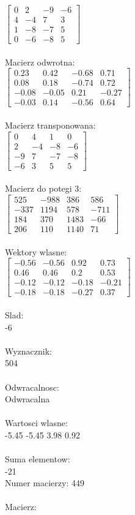 \documentclass[a4paper,12pt]{article}
\begin{document}
$\begin{bmatrix} 0&2&-9&-6\\4&-4&7&3\\1&-8&-7&5\\0&-6&-8&5 \end{bmatrix}$
\\
\\
Macierz odwrotna:\\

$\begin{bmatrix} 0.23&0.42&-0.68&0.71\\0.08&0.18&-0.74&0.72\\-0.08&-0.05&0.21&-0.27\\-0.03&0.14&-0.56&0.64 \end{bmatrix}$
\\
\\
Macierz transponowana:\\

$\begin{bmatrix} 0&4&1&0\\2&-4&-8&-6\\-9&7&-7&-8\\-6&3&5&5 \end{bmatrix}$
\\
\\
Macierz do potegi 3:\\

$\begin{bmatrix} 525&-988&386&586\\-337&1194&578&-711\\184&370&1483&-66\\206&110&1140&71 \end{bmatrix}$
\\
\\
Wektory wlasne:\\

$\begin{bmatrix} -0.56&-0.56&0.92&0.73\\0.46&0.46&0.2&0.53\\-0.12&-0.12&-0.18&-0.21\\-0.18&-0.18&-0.27&0.37 \end{bmatrix}$
\\
\\
Slad:\\
-6
\\
\\
Wyznacznik:\\
504
\\
\\
Odwracalnosc:\\
Odwracalna
\\
\\
Wartosci wlasne:\\
-5.45 -5.45 3.98 0.92
\\
\\
Suma elementow:\\
-21
\\
\newpage
Numer macierzy:
449
\\
\\
Macierz:\\
\end{document}
